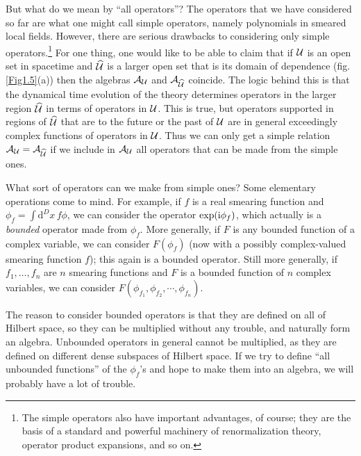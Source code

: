 \documentclass[12pt]{article}
\def\h{\widehat}
\numberwithin{equation}{section}
\def\d{\mathrm d}
\def\A{{\mathcal A}}
\begin{document}
But what do we mean by ``all operators''?   The operators that we have considered so far are what one might call simple operators,
namely polynomials in smeared local fields.  However, there are serious drawbacks to considering only simple operators.\footnote{The simple operators
also have important advantages, of course; they are the basis of a standard and powerful machinery of renormalization theory, operator product expansions, and
so on.}   For
one thing,  one would like to be able to claim \cite{HS} that if ${\mathcal U}$ is an open set in spacetime and $\h\U$ is a larger open set that is its
domain of dependence (fig.  \ref{Fig1.5}(a)) then the algebras $\A_\U$ and $\A_{\h\U}$ coincide.  The logic behind this is that
the dynamical time evolution of the theory determines operators in the larger region $\h\U$ in terms of operators in ${\mathcal U}$.   This
is true, but operators supported in regions of $\h\U$ that are to the future or the past of ${\mathcal U}$ are in general exceedingly complex
functions of operators in ${\mathcal U}$.  Thus we can only get a simple relation $\A_\U=\A_{\h\U}$ if we include in $\A_\U$ all operators
that can be made from the simple ones.

What sort of operators can we make from simple ones?    Some elementary operations come to mind.  For example, if $f$
is a real smearing function and $\phi_f=\int \d^Dx\, f\phi$, we can consider the operator $\exp({\mathrm i} \phi_f)$, which actually is a {\it bounded}
operator made from $\phi_f$.  More generally, if $F$ is any bounded function of a complex variable, we can consider $F(\phi_f)$ (now with a possibly complex-valued
smearing function $f$);
this again is a bounded operator.
Still more generally, if $f_1,\dots,f_n$ are $n$ smearing functions and $F$ is a bounded function of $n$ complex variables,
we can consider $F(\phi_{f_1},\phi_{f_2},\cdots,\phi_{f_n})$.  

The reason to consider bounded operators is that they  are defined on all of Hilbert space, so  they 
can be multiplied without any trouble, and  naturally form an algebra.  Unbounded
operators in general cannot be multiplied, as they are defined on different dense subspaces of Hilbert space.
If we try to define  ``all unbounded functions'' of the $\phi_f$'s and hope to make them into an algebra, we will probably
have a lot of trouble.   
\end{document}
